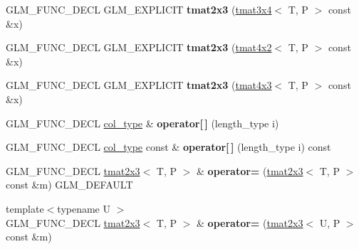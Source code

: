 \begin{DoxyCompactItemize}
\item 
\mbox{\label{structglm_1_1tmat2x3_aa2f1a3ee821a8ac9f2ee610a27b2786b}} 
G\+L\+M\+\_\+\+F\+U\+N\+C\+\_\+\+D\+E\+CL G\+L\+M\+\_\+\+E\+X\+P\+L\+I\+C\+IT {\bfseries tmat2x3} (\hyperlink{structglm_1_1tmat3x4}{tmat3x4}$<$ T, P $>$ const \&x)
\item 
\mbox{\label{structglm_1_1tmat2x3_a0e17446454497d323a6f1dc09a68ea5f}} 
G\+L\+M\+\_\+\+F\+U\+N\+C\+\_\+\+D\+E\+CL G\+L\+M\+\_\+\+E\+X\+P\+L\+I\+C\+IT {\bfseries tmat2x3} (\hyperlink{structglm_1_1tmat4x2}{tmat4x2}$<$ T, P $>$ const \&x)
\item 
\mbox{\label{structglm_1_1tmat2x3_a1c167271dd959e664021e1accd456bf1}} 
G\+L\+M\+\_\+\+F\+U\+N\+C\+\_\+\+D\+E\+CL G\+L\+M\+\_\+\+E\+X\+P\+L\+I\+C\+IT {\bfseries tmat2x3} (\hyperlink{structglm_1_1tmat4x3}{tmat4x3}$<$ T, P $>$ const \&x)
\item 
\mbox{\label{structglm_1_1tmat2x3_a02f967c3523ed282c9dfa3b75e717bef}} 
G\+L\+M\+\_\+\+F\+U\+N\+C\+\_\+\+D\+E\+CL \hyperlink{structglm_1_1tvec3}{col\+\_\+type} \& {\bfseries operator\mbox{[}$\,$\mbox{]}} (length\+\_\+type i)
\item 
\mbox{\label{structglm_1_1tmat2x3_a560b4b9dbb25b1dcd476f0a90168fb6d}} 
G\+L\+M\+\_\+\+F\+U\+N\+C\+\_\+\+D\+E\+CL \hyperlink{structglm_1_1tvec3}{col\+\_\+type} const  \& {\bfseries operator\mbox{[}$\,$\mbox{]}} (length\+\_\+type i) const
\item 
\mbox{\label{structglm_1_1tmat2x3_a1dc530650ac58a87d120532ad77ed332}} 
G\+L\+M\+\_\+\+F\+U\+N\+C\+\_\+\+D\+E\+CL \hyperlink{structglm_1_1tmat2x3}{tmat2x3}$<$ T, P $>$ \& {\bfseries operator=} (\hyperlink{structglm_1_1tmat2x3}{tmat2x3}$<$ T, P $>$ const \&m) G\+L\+M\+\_\+\+D\+E\+F\+A\+U\+LT
\item 
\mbox{\label{structglm_1_1tmat2x3_afaeb9829210555e86d1bce194f4f57c2}} 
{\footnotesize template$<$typename U $>$ }\\G\+L\+M\+\_\+\+F\+U\+N\+C\+\_\+\+D\+E\+CL \hyperlink{structglm_1_1tmat2x3}{tmat2x3}$<$ T, P $>$ \& {\bfseries operator=} (\hyperlink{structglm_1_1tmat2x3}{tmat2x3}$<$ U, P $>$ const \&m)

\end{DoxyCompactItemize}
